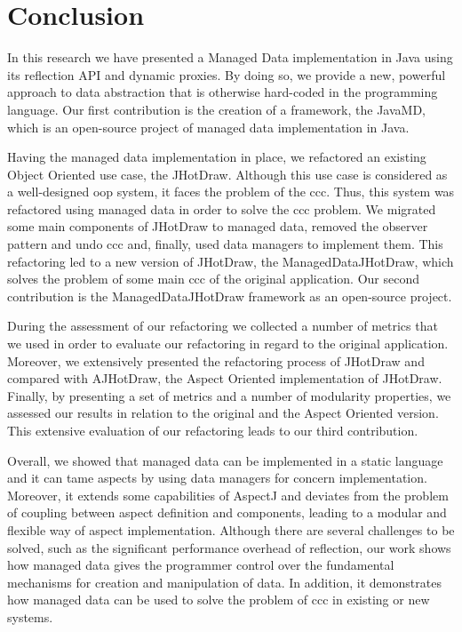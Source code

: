 
\chapter{Conclusion}\label{Conclusion}
In this research we have presented a Managed Data implementation in Java using its reflection API and dynamic proxies.
By doing so, we provide a new, powerful approach to data abstraction that is otherwise hard-coded in the programming language.
Our first contribution is the creation of a framework, the JavaMD, which is an open-source project of managed data implementation in Java.

Having the managed data implementation in place, we refactored an existing Object Oriented use case, the JHotDraw.
Although this use case is considered as a well-designed \ac{oop} system, it faces the problem of the \ac{ccc}.
Thus, this system was refactored using managed data in order to solve the \ac{ccc} problem.
We migrated some main components of JHotDraw to managed data, removed the observer pattern and undo \ac{ccc} and, finally, used data managers to implement them.
This refactoring led to a new version of JHotDraw, the ManagedDataJHotDraw, which solves the problem of some main \ac{ccc} of the original application.
Our second contribution is the ManagedDataJHotDraw framework as an open-source project.

During the assessment of our refactoring we collected a number of metrics that we used in order to evaluate our refactoring in regard to the original application.
Moreover, we extensively presented the refactoring process of JHotDraw and compared with AJHotDraw, the Aspect Oriented implementation of JHotDraw.
Finally, by presenting a set of metrics and a number of modularity properties, we assessed our results in relation to the original and the Aspect Oriented version.
This extensive evaluation of our refactoring leads to our third contribution.

Overall, we showed that managed data can be implemented in a static language and it can tame aspects by using data managers for concern implementation.
Moreover, it extends some capabilities of AspectJ and deviates from the problem of coupling between aspect definition and components, leading to a modular and flexible way of aspect implementation.
Although there are several challenges to be solved, such as the significant performance overhead of reflection, our work shows how managed data gives the programmer control over the fundamental mechanisms for creation and manipulation of data.
In addition, it demonstrates how managed data can be used to solve the problem of \ac{ccc} in existing or new systems.
